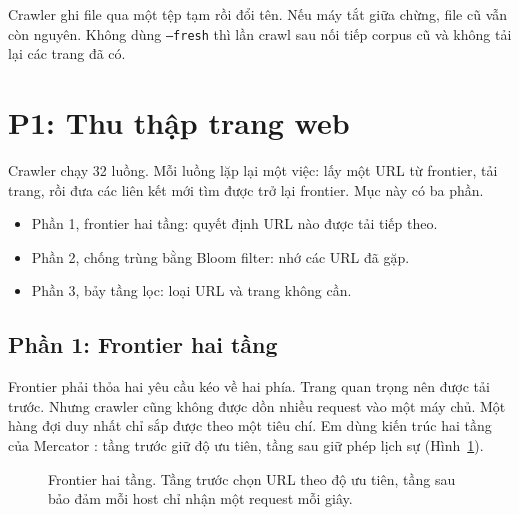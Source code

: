 \documentclass[9pt,twocolumn,a4paper]{extarticle}
\newcommand{\code}[1]{\texttt{#1}}
\begin{document}
Crawler ghi file qua một tệp tạm rồi đổi tên. Nếu máy tắt giữa chừng, file cũ vẫn còn nguyên. Không dùng \code{--fresh} thì lần crawl sau nối tiếp corpus cũ và không tải lại các trang đã có.

\section{P1: Thu thập trang web}
\label{chap:p1}
Crawler chạy 32 luồng. Mỗi luồng lặp lại một việc: lấy một URL từ frontier, tải trang, rồi đưa các liên kết mới tìm được trở lại frontier. Mục này có ba phần.
\begin{itemize}\itemsep0pt
\item Phần 1, frontier hai tầng: quyết định URL nào được tải tiếp theo.
\item Phần 2, chống trùng bằng Bloom filter: nhớ các URL đã gặp.
\item Phần 3, bảy tầng lọc: loại URL và trang không cần.
\end{itemize}

\subsection{Phần 1: Frontier hai tầng}
\label{sec:frontier}
Frontier phải thỏa hai yêu cầu kéo về hai phía. Trang quan trọng nên được tải trước. Nhưng crawler cũng không được dồn nhiều request vào một máy chủ. Một hàng đợi duy nhất chỉ sắp được theo một tiêu chí. Em dùng kiến trúc hai tầng của Mercator \cite{heydon1999mercator}: tầng trước giữ độ ưu tiên, tầng sau giữ phép lịch sự (Hình~\ref{fig:frontier}).

\begin{figure}[H]
\centering
{}
\caption{Frontier hai tầng. Tầng trước chọn URL theo độ ưu tiên, tầng sau bảo đảm mỗi host chỉ nhận một request mỗi giây.}
\label{fig:frontier}
\end{figure}
\end{document}
